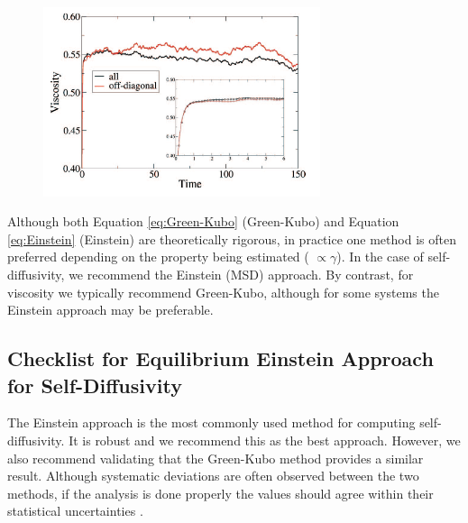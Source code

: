 \documentclass[9pt]{livecoms}
\begin{document}
\begin{figure}[htb!]
	\centering
	\includegraphics[width=3.2in]{figures/ChenFig1.png}
	\caption{}
	\label{fig:ChenFig1}
\end{figure}

Although both Equation \ref{eq:Green-Kubo} (Green-Kubo) and Equation \ref{eq:Einstein} (Einstein) are theoretically rigorous, in practice one method is often preferred depending on the property being estimated ( $\propto \gamma$). In the case of self-diffusivity, we recommend the Einstein (MSD) approach. By contrast, for viscosity we typically recommend Green-Kubo, although for some systems the Einstein approach may be preferable.

\subsection{Checklist for Equilibrium Einstein Approach for Self-Diffusivity}


The Einstein approach is the most commonly used method for computing self-diffusivity. It is robust and we recommend this as the best approach. However, we also recommend validating that the Green-Kubo method provides a similar result. Although systematic deviations are often observed between the two methods, if the analysis is done properly the values should agree within their statistical uncertainties \cite{Kondratyuk2016,Liu2012}. 
\end{document}
